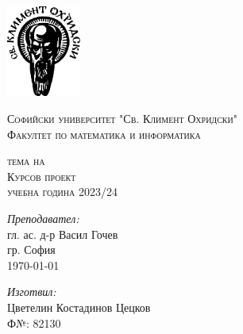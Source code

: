 \newcommand{\univname}{Софийски университет "Св. Климент Охридски"\\Факултет по математика и информатика}

\begin{titlepage}
    \begin{center}
    \vspace*{-2.3cm}
    \includegraphics[height=3cm]{resources/su_logo.png}
        
    \vspace*{.06\textheight}
    {\scshape\large \univname\par}\vspace{2.5cm}
    
    {\huge \bfseries{\thetitle}\par}\vspace{0.7cm}
    \textsc{\small тема на}\\[0.6cm]
    \textsc{\Large Курсов проект}\\[0.5cm]\vspace{0.5cm}
    \textsc{\normalsize учебна година 2023/24}\\[0.6cm]\vspace{2.2cm}
    
        
    \begin{minipage}[t]{0.4\textwidth}
    \begin{flushleft} \large
    \emph{Преподавател:}\\[0.7cm]
    гл. ас. д-р Васил Гочев\\[1.6cm]
    гр. София\\[0.5cm]
    {\large \today}
    \end{flushleft}
    \end{minipage}
    \begin{minipage}[t]{0.4\textwidth}
    \begin{flushright} \large
    \emph{Изготвил:}\\[0.7cm]
    Цветелин Костадинов Цецков\\[0.5cm]
    Ф№: 82130\\[0.5cm]
    \end{flushright}
    \end{minipage}
         
    \end{center}
\end{titlepage}